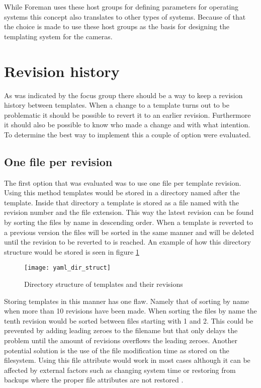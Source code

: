 While Foreman uses these host groups for defining parameters for operating systems this concept also translates to other types of systems.
Because of that the choice is made to use these host groups as the basis for designing the templating system for the cameras.


\section{Revision history}
As was indicated by the focus group there should be a way to keep a revision history between templates.
When a change to a template turns out to be problematic it should be possible to revert it to an earlier revision.
Furthermore it should also be possible to know who made a change and with what intention.
To determine the best way to implement this a couple of option were evaluated.

\subsection{One file per revision}
The first option that was evaluated was to use one file per template revision.
Using this method templates would be stored in a directory named after the template.
Inside that directory a template is stored as a file named with the revision number and the file extension.
This way the latest revision can be found by sorting the files by name in descending order.
When a template is reverted to a previous version the files will be sorted in the same manner and will be deleted until the revision to be reverted to is reached. An example of how this directory structure would be stored is seen in figure \ref{fig:diskstruct}

\begin{figure}[h!]
	\centering
	\texttt{[image: yaml\_dir\_struct]}
	\caption{Directory structure of templates and their revisions}
	\label{fig:diskstruct}
\end{figure}

Storing templates in this manner has one flaw.
Namely that of sorting by name when more than 10 revisions have been made.
When sorting the files by name the tenth revision would be sorted between files starting with 1 and 2.
This could be prevented by adding leading zeroes to the filename but that only delays the problem until the amount of revisions overflows the leading zeroes.
Another potential solution is the use of the file modification time as stored on the filesystem.
Using this file attribute would work in most cases although it can be affected by external factors such as changing system time or restoring from backups where the proper file attributes are not restored \cite{noauthor_mtime_nodate}.


